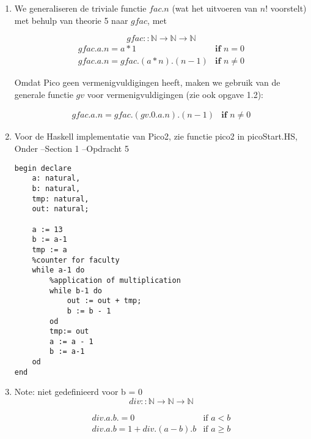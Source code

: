 \documentclass[12pt]{article}
\newcommand{\N}{\mathbb{N}}
\begin{document}
\begin{enumerate}
        
    \item
        We generaliseren de triviale functie $fac.n$ (wat het uitvoeren van $n!$ voorstelt) met behulp van theorie 5 naar $gfac$, met
        
        \begin{equation}
            gfac :: \N \rightarrow \N \rightarrow \N 
        \end{equation}
        \begin{displaymath}
        \begin{array}{ll}
        gfac.a.n = a * 1 & \textbf{if } n = 0\\
        gfac.a.n = gfac.(a*n).(n-1) & \textbf{if } n \neq 0
        \end{array}
        \end{displaymath}

        Omdat Pico geen vermenigvuldigingen heeft, maken we gebruik van de generale functie $gv$ voor vermenigvuldigingen (zie ook opgave 1.2):
        
        \begin{displaymath}
        \begin{array}{ll}
            gfac.a.n = gfac.(gv.0.a.n).(n-1) & \textbf{if } n  \neq 0
        \end{array}
        \end{displaymath}
    
    \item Voor de Haskell implementatie van Pico2, zie functie pico2 in picoStart.HS, Onder --Section 1 --Opdracht 5
    \begin{verbatim}
begin declare
    a: natural,
    b: natural,
    tmp: natural,
    out: natural;

    a := 13
    b := a-1
    tmp := a
    %counter for faculty
    while a-1 do
        %application of multiplication
        while b-1 do
            out := out + tmp;
            b := b - 1
        od
        tmp:= out
        a := a - 1
        b := a-1
    od    
end
        \end{verbatim} 
        

    \item 
        Note: niet gedefinieerd voor b = 0
        \begin{equation} div:: \N \rightarrow \N \rightarrow \N \end{equation}
        
        \begin{displaymath}
        \begin{array}{ll}
            div.a.b. = 0 & \textrm{if }a < b \\
            div.a.b = 1 + div.(a-b).b & \textrm{if } a \geq b
        \end{array}
        \end{displaymath}


\end{enumerate}
\end{document}

